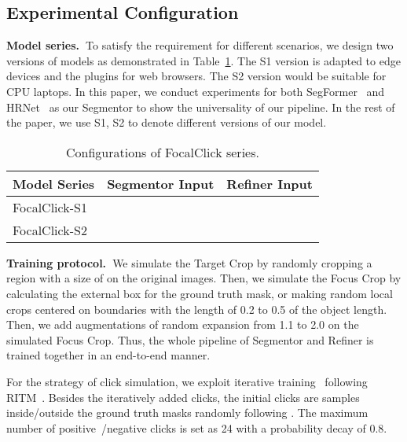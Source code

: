 \documentclass[10pt,twocolumn,letterpaper]{article}
\begin{document}
\subsection{Experimental Configuration}
\noindent \textbf{Model series.~}To satisfy the requirement for different scenarios, we design two versions of models as demonstrated in Table~\ref{tab:series}. The S1 version is adapted to edge devices and the plugins for web browsers.  The S2 version would be suitable for CPU laptops. In this paper, we conduct experiments for both SegFormer~\cite{xie2021segformer} and HRNet~\cite{wang2020hrnet} as our Segmentor to show the universality of our pipeline. In the rest of the paper, we use S1, S2 to denote different versions of our model. 
\begin{table}[h]
\small
\begin{center}
\begin{threeparttable}
\begin{tabular}{l|c|c  }
\toprule[1pt]
Model Series       & Segmentor Input &  Refiner Input \\
\hline
FocalClick-S1  &  &  \\
FocalClick-S2  &  &  \\
\bottomrule[1pt]
\end{tabular}
\end{threeparttable}
\end{center}
\vspace{-5mm}
\caption{ Configurations of FocalClick series.  
}
\label{tab:series}
\end{table}



\noindent \textbf{Training protocol.~}We simulate the Target Crop by randomly cropping a region with a size of  on the original images. Then, we simulate the Focus Crop by calculating the external box for the ground truth mask, or making random local crops centered on boundaries with the length of 0.2 to 0.5 of the object length. 
Then, we add augmentations of random expansion from 1.1 to 2.0 on the simulated Focus Crop. Thus, the whole pipeline of Segmentor and Refiner is trained together in an end-to-end manner.

For the strategy of click simulation, we exploit iterative training~\cite{mahadevan2018iteratively} following RITM~\cite{sofiiuk2021ritm}. Besides the iteratively added clicks, the initial clicks are samples inside/outside the ground truth masks randomly following \cite{xu2016deep}. The maximum number of positive~/negative clicks is set as 24 with a probability decay of 0.8. 
\end{document}
